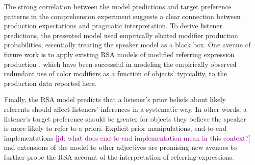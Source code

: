 \documentclass[10pt,letterpaper]{article}
\newcommand{\jd}[1]{\textcolor{Purple}{[jd: #1]}}
\begin{document}
The strong correlation between the model predictions and target preference patterns in the comprehension experiment suggests a clear connection between production expectations and pragmatic interpretation. To derive listener predictions, the presented model used empirically elicited modifier production probabilities, essentially treating the speaker model as a black box. One avenue of future work is to apply existing RSA models of modified referring expression production \cite{Degen:2020}, which have been successful in modeling the empirically observed redundant use of color modifiers as a function of objects' typicality, to the production data reported here.

Finally, the RSA model predicts that a listener's prior beliefs about likely referents should affect listeners' inferences in a systematic way. In other words, a listener's target preference should be greater for objects they believe the speaker is more likely to refer to a priori. Explicit prior manipulations, end-to-end implementations \jd{what does end-to-end implementation mean in this context?} and extensions of the model to other adjectives are promising new avenues to further probe the RSA account of the interpretation of referring expressions. 
\end{document}
